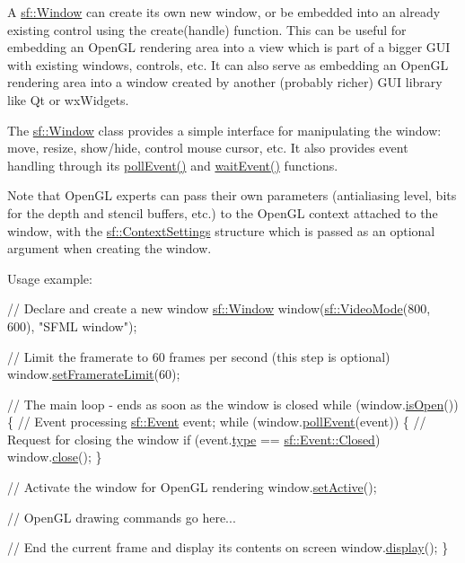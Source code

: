 A \hyperlink{classsf_1_1Window}{sf\+::\+Window} can create its own new window, or be embedded into an already existing control using the create(handle) function. This can be useful for embedding an Open\+GL rendering area into a view which is part of a bigger G\+UI with existing windows, controls, etc. It can also serve as embedding an Open\+GL rendering area into a window created by another (probably richer) G\+UI library like Qt or wx\+Widgets.

The \hyperlink{classsf_1_1Window}{sf\+::\+Window} class provides a simple interface for manipulating the window\+: move, resize, show/hide, control mouse cursor, etc. It also provides event handling through its \hyperlink{classsf_1_1Window_a338e996585faf82e93069858e3b531b7}{poll\+Event()} and \hyperlink{classsf_1_1Window_aaf02ab64fbc1d374eef3696df54137bc}{wait\+Event()} functions.

Note that Open\+GL experts can pass their own parameters (antialiasing level, bits for the depth and stencil buffers, etc.) to the Open\+GL context attached to the window, with the \hyperlink{structsf_1_1ContextSettings}{sf\+::\+Context\+Settings} structure which is passed as an optional argument when creating the window.

Usage example\+: 
\begin{DoxyCode}
\textcolor{comment}{// Declare and create a new window}
\hyperlink{classsf_1_1Window}{sf::Window} window(\hyperlink{classsf_1_1VideoMode}{sf::VideoMode}(800, 600), \textcolor{stringliteral}{"SFML window"});

\textcolor{comment}{// Limit the framerate to 60 frames per second (this step is optional)}
window.\hyperlink{classsf_1_1Window_af4322d315baf93405bf0d5087ad5e784}{setFramerateLimit}(60);

\textcolor{comment}{// The main loop - ends as soon as the window is closed}
\textcolor{keywordflow}{while} (window.\hyperlink{classsf_1_1Window_ae873503db7d48157bb9cbf6129562bce}{isOpen}())
\{
   \textcolor{comment}{// Event processing}
   \hyperlink{classsf_1_1Event}{sf::Event} event;
   \textcolor{keywordflow}{while} (window.\hyperlink{classsf_1_1Window_a338e996585faf82e93069858e3b531b7}{pollEvent}(event))
   \{
       \textcolor{comment}{// Request for closing the window}
       \textcolor{keywordflow}{if} (event.\hyperlink{classsf_1_1Event_adf2f8044f713fd9d6019077b0d1ffe0a}{type} == \hyperlink{classsf_1_1Event_af41fa9ed45c02449030699f671331d4aa316e4212e083f1dce79efd8d9e9c0a95}{sf::Event::Closed})
           window.\hyperlink{classsf_1_1Window_a99d1e030387b0c26f5995670504fe7b5}{close}();
   \}

   \textcolor{comment}{// Activate the window for OpenGL rendering}
   window.\hyperlink{classsf_1_1Window_aaab549da64cedf74fa6f1ae7a3cc79e0}{setActive}();

   \textcolor{comment}{// OpenGL drawing commands go here...}

   \textcolor{comment}{// End the current frame and display its contents on screen}
   window.\hyperlink{classsf_1_1Window_adabf839cb103ac96cfc82f781638772a}{display}();
\}
\end{DoxyCode}
 

